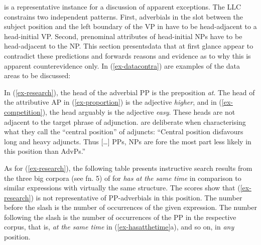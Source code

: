 \documentclass[output=paper
  ,nobabel
  ,uniformtopskip %
]{langscibook}
\begin{document}
 is a representative instance for a discussion of apparent exceptions. The LLC constrains two independent patterns. First, adverbials in the slot between the subject position and the left boundary of the VP in  have to be head-adjacent to a head-initial VP. Second, prenominal attributes of head-initial NPs have to be head-adjacent to the NP. This section presents\pagebreak data that at first glance appear to contradict these predictions and forwards reasons and evidence as to why this is apparent counterevidence only. In (\ref{ex-datacontra}) are examples of the data areas to be discussed:

\eal\label{ex-datacontra}
\label{ex-research}

\label{ex-proportion}

\label{ex-competition}

\zl

\noindent
In (\ref{ex-research}), the head of the adverbial PP is the preposition \emph{at}. The head of the attributive AP in (\ref{ex-proportion}) is the adjective \emph{higher}, and in (\ref{ex-competition}), the head arguably is the adjective \emph{easy}. These heads are not adjacent to the target phrase of adjunction. \citet*[780]{HuddlestonPullum2002} are deliberate when characterising what they call the ``central position'' of adjuncts: ``Central position disfavours long and heavy adjuncts. Thus [\ldots] PPs, NPs are fore the most part less likely in this position than AdvPs.''

As for (\ref{ex-research}), the following table presents instructive search results from the three big corpora (see fn. 5) of  for \emph{has at the same time} in comparison to similar expressions with virtually the same structure. The scores show that (\ref{ex-research}) is not representative of PP-adverbials in this position. The number before the slash is the number of occurrences of the given expression. The number following the slash is the number of occurrences of the PP in the respective corpus, that is, \emph{at the same time} in (\ref{ex-hasatthetime}a), and so on, in \emph{any} position.
\end{document}
